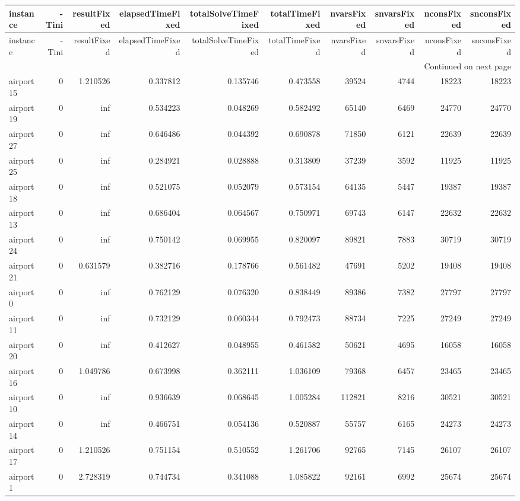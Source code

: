 
\begin{longtable}{|l|r|r|r|r|r|r|r|r|r|}
\toprule
instance & -Tini & resultFixed & elapsedTimeFixed & totalSolveTimeFixed & totalTimeFixed & nvarsFixed & snvarsFixed & nconsFixed & snconsFixed \\
\midrule
\endfirsthead
\toprule
instance & -Tini & resultFixed & elapsedTimeFixed & totalSolveTimeFixed & totalTimeFixed & nvarsFixed & snvarsFixed & nconsFixed & snconsFixed \\
\midrule
\endhead
\midrule
\multicolumn{10}{r}{Continued on next page} \\
\midrule
\endfoot
\bottomrule
\endlastfoot
airport15 & 0 & 1.210526 & 0.337812 & 0.135746 & 0.473558 & 39524 & 4744 & 18223 & 18223 \\
airport19 & 0 & inf & 0.534223 & 0.048269 & 0.582492 & 65140 & 6469 & 24770 & 24770 \\
airport27 & 0 & inf & 0.646486 & 0.044392 & 0.690878 & 71850 & 6121 & 22639 & 22639 \\
airport25 & 0 & inf & 0.284921 & 0.028888 & 0.313809 & 37239 & 3592 & 11925 & 11925 \\
airport18 & 0 & inf & 0.521075 & 0.052079 & 0.573154 & 64135 & 5447 & 19387 & 19387 \\
airport13 & 0 & inf & 0.686404 & 0.064567 & 0.750971 & 69743 & 6147 & 22632 & 22632 \\
airport24 & 0 & inf & 0.750142 & 0.069955 & 0.820097 & 89821 & 7883 & 30719 & 30719 \\
airport21 & 0 & 0.631579 & 0.382716 & 0.178766 & 0.561482 & 47691 & 5202 & 19408 & 19408 \\
airport0 & 0 & inf & 0.762129 & 0.076320 & 0.838449 & 89386 & 7382 & 27797 & 27797 \\
airport11 & 0 & inf & 0.732129 & 0.060344 & 0.792473 & 88734 & 7225 & 27249 & 27249 \\
airport20 & 0 & inf & 0.412627 & 0.048955 & 0.461582 & 50621 & 4695 & 16058 & 16058 \\
airport16 & 0 & 1.049786 & 0.673998 & 0.362111 & 1.036109 & 79368 & 6457 & 23465 & 23465 \\
airport10 & 0 & inf & 0.936639 & 0.068645 & 1.005284 & 112821 & 8216 & 30521 & 30521 \\
airport14 & 0 & inf & 0.466751 & 0.054136 & 0.520887 & 55757 & 6165 & 24273 & 24273 \\
airport17 & 0 & 1.210526 & 0.751154 & 0.510552 & 1.261706 & 92765 & 7145 & 26107 & 26107 \\
airport1 & 0 & 2.728319 & 0.744734 & 0.341088 & 1.085822 & 92161 & 6992 & 25674 & 25674 \\

\end{longtable}
